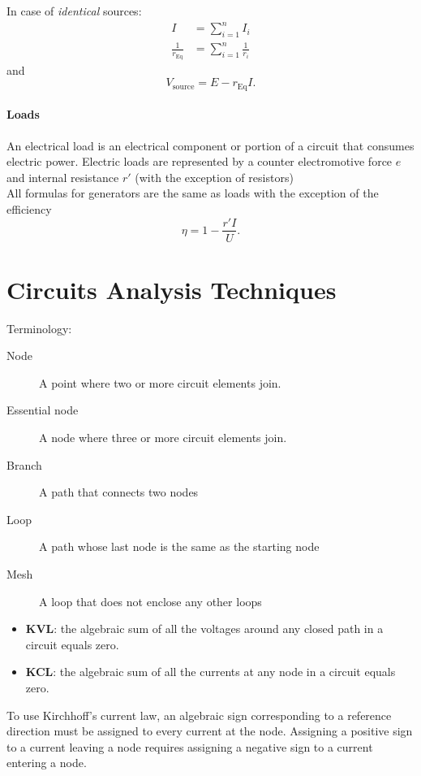 \documentclass[a4paper,12pt]{article}
\begin{document}
In case of \emph{identical} sources:
\begin{align*}
	I                     & =\sum_{i=1}^{n} I_i           \\
	\frac{1}{r_\text{Eq}} & =\sum_{i=1}^{n} \frac{1}{r_i}
\end{align*}
and
\[
	V_\text{source}=E - r_\text{Eq}I
	.\]

\subsection{Loads}
An electrical load is an electrical component or portion of a circuit that consumes electric power.
Electric loads are represented by a counter electromotive force $e$ and internal resistance $r'$ (with the exception of resistors)\\

All formulas for generators are the same as loads with the exception of the efficiency
\[
	\eta = 1-\frac{r'I}{U}
	.\]


\part{Circuits Analysis Techniques}
Terminology:
\begin{description}
	\item[Node] A point where two or more circuit elements join.
	\item[Essential node] A node where three or more circuit elements join.
	\item[Branch]  A path that connects two nodes
	\item[Loop] A path whose last node is the same as the starting node
	\item[Mesh] A loop that does not enclose any other loops
\end{description}

\begin{itemize}
	\item \textbf{KVL}: the algebraic sum of all the voltages around any closed path in a circuit equals zero.
	\item \textbf{KCL}: the algebraic sum of all the currents at any node in a circuit equals zero.
\end{itemize}

To use Kirchhoff's current law, an algebraic sign corresponding to a reference
direction must be assigned to every current at the node. Assigning a positive sign to
a current leaving a node requires assigning a negative sign to a current entering a
node.
\end{document}
